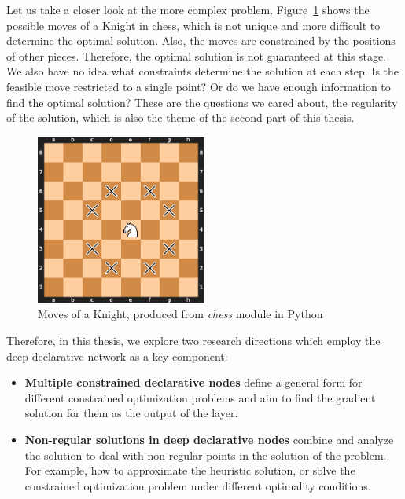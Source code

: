 \par Let us take a closer look at the more complex problem.  Figure~\ref{fig:chess} shows the possible moves of a Knight in chess, which is not unique and more difficult to determine the optimal solution. Also, the moves are constrained by the positions of other pieces. Therefore, the optimal solution is not guaranteed at this stage. We also have no idea what constraints determine the solution at each step. Is the feasible move restricted to a single point? Or do we have enough information to find the optimal solution? These are the questions we cared about, the regularity of the solution, which is also the theme of the second part of this thesis. 
\begin{figure}[t]
    \label{fig:chess}
    \centering
    \includegraphics[page=1, width=0.5\textwidth]{figs/chess.pdf}
    \caption{Moves of a Knight, produced from \textit{chess} module in Python}
\end{figure}
\par Therefore, in this thesis, we explore two research directions which employ the deep declarative network as a key component:
\begin{itemize}
    \item \textbf{Multiple constrained declarative nodes} define a general form for different constrained optimization problems and aim to find the gradient solution for them as the output of the layer. 
    \item \textbf{Non-regular solutions in deep declarative nodes} combine and analyze the solution to deal with non-regular points in the solution of the problem. For example, how to approximate the heuristic solution, or solve the constrained optimization problem under different optimality conditions. 
\end{itemize}

